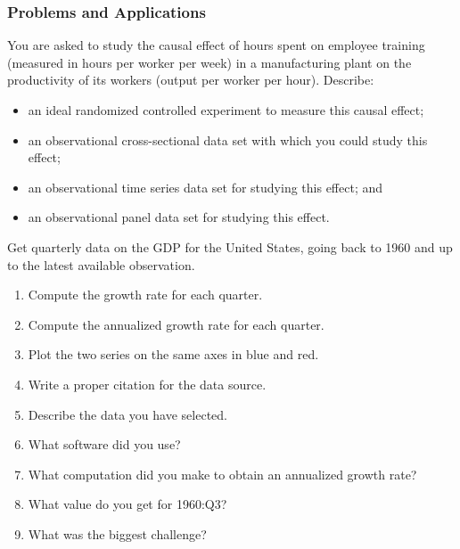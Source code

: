 

\begin{frame}[shrink=5]
\frametitle{Problems and Applications}
You are asked to study the causal effect of hours spent on employee training (measured in hours per worker per week) in a manufacturing plant on the productivity of its workers (output per worker per hour). Describe:
\begin{itemize}
\item an ideal randomized controlled experiment to measure this causal effect;
\item an observational cross-sectional data set with which you could study this
effect;
\item an observational time series data set for studying this effect; and
\item an observational panel data set for studying this effect.
\end{itemize}
\pause
{}
\pause
Get quarterly data on the GDP for the United States, going back to 1960 and up to the latest available observation. 
\begin{enumerate}
\item Compute the growth rate for each quarter. 
\item Compute the annualized growth rate for each quarter. 
\item Plot the two series on the same axes in blue and red.
\item Write a proper citation for the data source.
\item Describe the data you have selected.
\item What software did you use? 
\item What computation did you make to obtain an annualized growth rate?
\item What value do you get for 1960:Q3? 
\item What was the biggest challenge?
\end{enumerate}
\end{frame}


